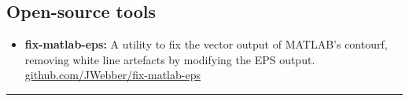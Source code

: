 \documentclass[a4paper]{article}
\begin{document}
\begin{multicols}{2}
        \subsection*{Open-source tools}
            \begin{itemize}
                \item \textbf{fix-matlab-eps:} A utility to fix the vector output of MATLAB's \textsf{contourf}, removing white line artefacts by modifying the EPS output. \\ \href{https://github.com/JWebber/fix-matlab-eps}{github.com/JWebber/fix-matlab-eps}
            \end{itemize}
    \end{multicols}

    \vspace{1.5em}
    \hrule
    \vspace{0.25em}
\end{document}
